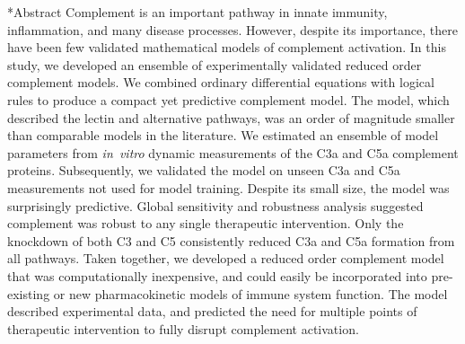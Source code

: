 \documentclass[12pt]{article}
\makeatletter
\renewcommand\section{\@startsection
	{subsection}{2}{0mm}
	{-0.2in}
	{0.05\baselineskip}
	{\normalfont\large\bfseries}}
\makeatother
\begin{document}
\section*{Abstract}
Complement is an important pathway in innate immunity, inflammation, and many disease processes.
However, despite its importance, there have been few validated mathematical models of complement activation.
In this study, we developed an ensemble of experimentally validated reduced order complement models.
We combined ordinary differential equations with logical rules to produce a compact yet predictive complement model.
The model,  which described the lectin and alternative pathways, was an order of magnitude smaller than comparable models in the literature.
We estimated an ensemble of model parameters from \textit{in~vitro} dynamic measurements of the C3a and C5a complement proteins.
Subsequently, we validated the model on unseen C3a and C5a measurements not used for model training.
Despite its small size, the model was surprisingly predictive.
Global sensitivity and robustness analysis suggested complement was robust to any single therapeutic intervention.
Only the knockdown of both C3 and C5 consistently reduced C3a and C5a formation from all pathways.
Taken together, we developed a reduced order complement model that was computationally inexpensive,
and could easily be incorporated into pre-existing or new pharmacokinetic models of immune system function.
The model described experimental data, and predicted the need for multiple points of therapeutic intervention to fully disrupt complement activation.

\end{document}
